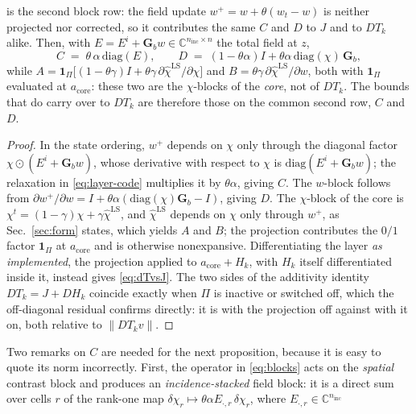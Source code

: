 \documentclass[journal,cmes,article,submit,moreauthors,pdftex]{Definitions/tsp}
\newcommand{\C}{\mathbb{C}}
\newcommand{\norm}[1]{\lVert #1 \rVert}
\newcommand{\numv}[1]{#1}
\begin{document}
\begin{Lemma}
is the second block row: the field update $w^{+}=w+\theta(w_t-w)$ is neither projected nor
corrected, so it contributes the same $C$ and $D$ to $J$ and to $DT_k$ alike. Then, with
$E=E^i+\mathbf{G}_b w\in\C^{n_{\mathrm{inc}}\times n}$
the total field at $z$,
\begin{equation}\label{eq:blocks}
C \;=\; \theta\,\alpha\,\mathrm{diag}(E),\qquad
D \;=\; (1-\theta\alpha)I+\theta\alpha\,\mathrm{diag}(\chi)\,\mathbf{G}_b ,
\end{equation}
while $A=\mathbf{1}_{\Pi}\big[(1-\theta\gamma)I+\theta\gamma\,
\partial\hat\chi^{\mathrm{LS}}/\partial\chi\big]$ and
$B=\theta\gamma\,\partial\hat\chi^{\mathrm{LS}}/\partial w$, both with $\mathbf{1}_{\Pi}$
evaluated at $a_{\mathrm{core}}$: these two are the $\chi$-blocks of the \emph{core}, not of
$DT_k$. The bounds that do carry over to $DT_k$ are therefore those on the common second row,
$C$ and $D$.
\end{Lemma}
\begin{proof}
In the state ordering, $w^{+}$ depends on $\chi$ only through the diagonal factor
$\chi\odot(E^i+\mathbf{G}_b w)$, whose derivative with respect to $\chi$ is
$\mathrm{diag}(E^i+\mathbf{G}_b w)$; the relaxation in \eqref{eq:layer-code} multiplies it by
$\theta\alpha$, giving $C$. The $w$-block follows from
$\partial w^{+}/\partial w=I+\theta\alpha(\mathrm{diag}(\chi)\mathbf{G}_b-I)$, giving $D$. The
$\chi$-block of the core is $\chi^{t}=(1-\gamma)\chi+\gamma\hat\chi^{\mathrm{LS}}$, and
$\hat\chi^{\mathrm{LS}}$ depends on $\chi$ only through $w^{+}$, as Sec.~\ref{sec:form} states, which yields
$A$ and $B$; the projection contributes the $0/1$ factor $\mathbf{1}_{\Pi}$ at
$a_{\mathrm{core}}$ and is otherwise nonexpansive. Differentiating the layer \emph{as
implemented}, the projection applied to $a_{\mathrm{core}}+H_k$, with $H_k$ itself
differentiated inside it, instead gives \eqref{eq:dTvsJ}. The two sides of the additivity identity
$DT_k=J+DH_k$ coincide exactly when $\Pi$ is inactive or switched off, which the off-diagonal
residual confirms directly: it is \numv{\NumTOneRelOff} with the projection off against
\numv{\NumTOneRelOn} with it on, both relative to $\norm{DT_kv}$.
\end{proof}
Two remarks on $C$ are needed for the next proposition, because it is easy to quote its norm
incorrectly. First, the operator in \eqref{eq:blocks} acts on the \emph{spatial} contrast block and
produces an \emph{incidence-stacked} field block: it is a direct sum over cells $r$ of the rank-one
map $\delta\chi_r\mapsto\theta\alpha E_{\cdot,r}\,\delta\chi_r$, where $E_{\cdot,r}\in\C^{n_{\mathrm{inc}}}$
\end{document}
